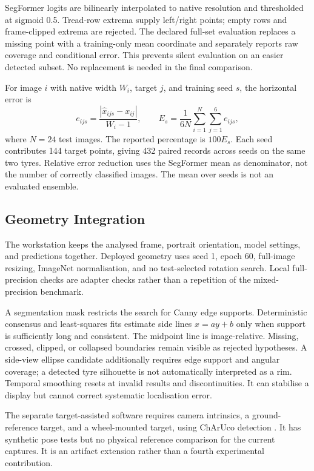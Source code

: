 SegFormer logits are bilinearly interpolated to native resolution and thresholded at sigmoid 0.5. Tread-row extrema supply left/right points; empty rows and frame-clipped extrema are rejected. The declared full-set evaluation replaces a missing point with a training-only mean coordinate and separately reports raw coverage and conditional error. This prevents silent evaluation on an easier detected subset. No replacement is needed in the final comparison.

For image $i$ with native width $W_i$, target $j$, and training seed $s$, the horizontal error is
\begin{equation}
e_{ijs}=\frac{|\hat x_{ijs}-x_{ij}|}{W_i-1},\qquad
E_s=\frac{1}{6N}\sum_{i=1}^{N}\sum_{j=1}^{6}e_{ijs},
\label{eq:error}
\end{equation}
where $N=24$ test images. The reported percentage is $100E_s$. Each seed contributes 144 target points, giving 432 paired records across seeds on the same two tyres. Relative error reduction uses the SegFormer mean as denominator, not the number of correctly classified images. The mean over seeds is not an evaluated ensemble.

\subsection{Geometry Integration}
\label{sec:geometry}
The workstation keeps the analysed frame, portrait orientation, model settings, and predictions together. Deployed geometry uses seed 1, epoch 60, full-image resizing, ImageNet normalisation, and no test-selected rotation search. Local full-precision checks are adapter checks rather than a repetition of the mixed-precision benchmark.

A segmentation mask restricts the search for Canny edge supports. Deterministic consensus and least-squares fits estimate side lines $x=ay+b$ only when support is sufficiently long and consistent. The midpoint line is image-relative. Missing, crossed, clipped, or collapsed boundaries remain visible as rejected hypotheses. A side-view ellipse candidate additionally requires edge support and angular coverage; a detected tyre silhouette is not automatically interpreted as a rim. Temporal smoothing resets at invalid results and discontinuities. It can stabilise a display but cannot correct systematic localisation error.

The separate target-assisted software requires camera intrinsics, a ground-reference target, and a wheel-mounted target, using ChArUco detection \cite{charuco}. It has synthetic pose tests but no physical reference comparison for the current captures. It is an artifact extension rather than a fourth experimental contribution.

